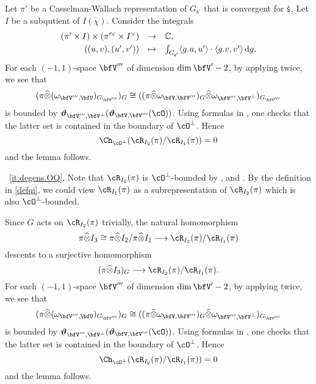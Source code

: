 \documentclass[12pt,a4paper]{amsart}
\newcommand{\od}{\operatorname{d}}
\newcommand{\la}{\langle}
\newcommand{\ra}{\rangle}
\newcommand{\be}{\begin {equation}}
\newcommand{\ee}{\end {equation}}
\numberwithin{equation}{section}
\theoremstyle{remark}
\def\abfV{\bfV'}
\def\bfVpe{\bfV^\perp}
\def\totimes{\widehat{\otimes}}
\begin{document}
Let $\pi'$ be a  Casselman-Wallach representation of $G_{\mathsf s'}$ that is convergent for ${\dot{\mathsf s}}$. Let $I$ be a subqutient of $I(\dot{\chi})$. Consider the integrals
\be\label{convint004}
\begin{array}{rcl}
 (\pi' \times I)\times (\pi'^\vee \times I^\vee )&\rightarrow &\C, \smallskip \\
   ((u,v),(u',v')) &\mapsto &\int_{G_{\mathsf s'}} \la g.u, u'\ra\cdot \la g.v, v'\ra \od\! g.
   \end{array}
 \ee
For each $(-1,1)$-space $\bfV'''$ of dimension $\dim
\abfV-2$, by applying  twice,
we see that
\[
(\pi\totimes (\omega_{\bfV''',\bfU})_{ G_{\bfV'''}})_{G}\cong ((\pi\totimes \omega_{\bfV,\bfV'''})_G\totimes \omega_{\bfV''',\bfVpe})_{ G_{\bfV'''}}
\]
 is
bounded by
$\oliftc_{\bfV''', \bfVpe}(\oliftc_{\bfV,\bfV'''}(\cO))$. Using formulas in  \cite[Theorem~5.2 and 5.6]{DKPC}, one checks that the latter set is contained in the boundary of  $\cO^\perp
$. Hence
\[
\Ch_{\cO^\perp}(\cR_{I_2}(\pi)/\cR_{I_1}(\pi)) = 0
\] and the lemma follows.




~\ref{it:degens.OQ}.
Note that $\cR_{I_2}(\pi)$ is $\cO^\perp$-bounded by ,
 and \cite[Theorem~1.4]{SV}.
By the definition in \cref{defqi}, we could view $\cR_{I_1}(\pi)$ as a
subrepresentation of  $ \cR_{I_2}(\pi)$ which is also $\cO^\perp$-bounded.

Since $G$ acts on $\cR_{I_2}(\pi)$ trivially, the natural homomorphism
\[
  \pi\totimes I_3\cong \pi\totimes I_2/\pi \totimes I_1\longrightarrow \cR_{I_2}(\pi)/\cR_{I_1}(\pi)\]
descents to a surjective homomorphism
\[
  (\pi\totimes  I_3)_{G}\longrightarrow \cR_{I_2}(\pi)/\cR_{I_1}(\pi).
\]
For each $(-1,1)$-space $\bfV'''$ of dimension $\dim
\abfV-2$, by applying  twice,
we see that
\[
(\pi\totimes (\omega_{\bfV''',\bfU})_{ G_{\bfV'''}})_{G}\cong ((\pi\totimes \omega_{\bfV,\bfV'''})_G\totimes \omega_{\bfV''',\bfVpe})_{ G_{\bfV'''}}
\]
 is
bounded by
$\oliftc_{\bfV''', \bfVpe}(\oliftc_{\bfV,\bfV'''}(\cO))$. Using formulas in  \cite[Theorem~5.2 and 5.6]{DKPC}, one checks that the latter set is contained in the boundary of  $\cO^\perp
$. Hence
\[
\Ch_{\cO^\perp}(\cR_{I_2}(\pi)/\cR_{I_1}(\pi)) = 0
\] and the lemma follows.
\end{document}

